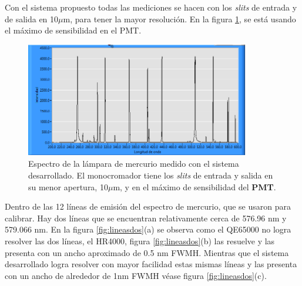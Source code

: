 Con el sistema propuesto todas las mediciones se hacen con los \textit{slits} de entrada y de salida en 10$\mu$m, para tener la mayor resolución.  En la figura \ref{fig:spectra100}, se está usando el máximo de sensibilidad en el PMT.
\begin{figure}[h!]
	\centering
	\includegraphics[width=0.9\linewidth, height=5cm]{Imagenes/4/spectra100}
	\caption{Espectro de la lámpara de mercurio medido con el sistema desarrollado. El monocromador tiene los \textit{slits} de entrada y salida en su menor apertura, 10$\mu$m, y en el máximo de sensibilidad del \textbf{PMT}.}
	\label{fig:spectra100}
\end{figure}
Dentro de las 12 líneas de emisión del espectro de mercurio, que se usaron para calibrar. Hay dos líneas que se encuentran relativamente cerca de 576.96 nm y 579.066 nm. En la figura \ref{fig:lineasdos}(a) se observa como el QE65000 no logra resolver las dos líneas, el HR4000, figura \ref{fig:lineasdos}(b) las resuelve y las presenta con un ancho aproximado de 0.5 nm FWMH. Mientras que el sistema desarrollado logra resolver con mayor facilidad estas mismas líneas y las presenta con un ancho de alrededor de 1nm FWMH véase figura \ref{fig:lineasdos}(c). 

